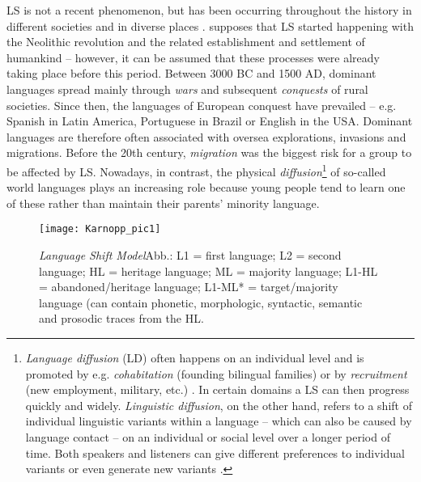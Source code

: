 \documentclass[output=paper,
modfonts
]{langscibook}
\begin{document}
LS is not a recent phenomenon, but has been occurring throughout the history in different societies and in diverse places \parencite[4]{Puthuval2017}. \cite[326-328]{Ostler2011} supposes that LS started happening with the Neolithic revolution and the related establishment and settlement of humankind -- however, it can be assumed that these processes were already taking place before this period. Between 3000 BC and 1500 AD, dominant languages spread mainly through \emph{wars} and subsequent \emph{conquests} of rural societies. Since then, the languages of European conquest have prevailed -- e.g. Spanish in Latin America, Portuguese in Brazil or English in the USA. Dominant languages are therefore often associated with oversea explorations, invasions and migrations. Before the 20th century, \emph{migration} was the biggest risk for a group to be affected by LS. Nowadays, in contrast, the physical \emph{diffusion}\footnote{\emph{Language diffusion} (LD) often happens on an individual level and is promoted by e.g. \emph{cohabitation} (founding bilingual families) or by \emph{recruitment} (new employment, military, etc.) \parencite[323-324]{Ostler2011}.  In certain domains a LS can then progress quickly and widely. \emph{Linguistic diffusion}, on the other hand, refers to a shift of individual linguistic variants within a language -- which can also be caused by language contact -- on an individual or social level over a longer period of time. Both speakers and listeners can give different preferences to individual variants or even generate new variants \parencite{Gong2012}.} of so-called world languages plays an increasing role because young people tend to learn one of these rather than maintain their parents' minority language. 
\begin{figure}
\texttt{[image: Karnopp\_pic1]}
\caption{\emph{Language Shift Model}Abb.: L1 = first
  language; L2 = second language; HL = heritage language; ML = majority
  language; L1-HL = abandoned/heritage language; L1-ML* =
  target/majority language (can contain phonetic, morphologic,
  syntactic, semantic and prosodic traces from the HL.}
\label{figure1}
\end{figure}

\end{document}
